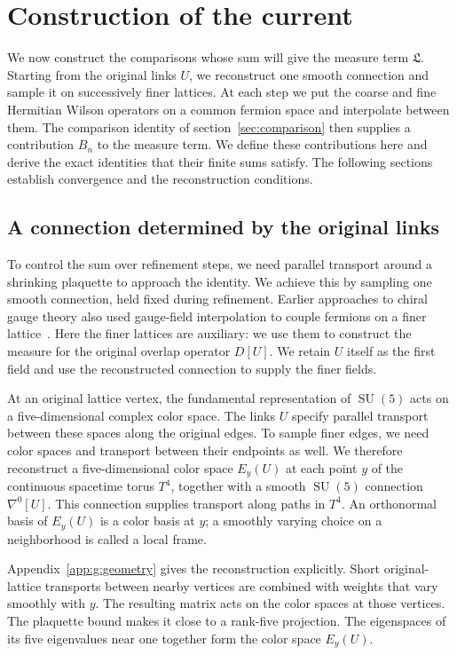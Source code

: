 \documentclass[11pt,a4paper]{article}
\theoremstyle{remark}
\DeclareMathOperator{\SU}{SU}
\begin{document}
\section{Construction of the current}
\label{sec:construction}

We now construct the comparisons whose sum will give the measure term
$\mathfrak L$. Starting from the original links $U$, we reconstruct one
smooth connection and sample it on successively finer lattices. At each
step we put the coarse and fine Hermitian Wilson operators on a common
fermion space and interpolate between them. The comparison identity of
section~\ref{sec:comparison} then supplies a contribution $B_n$ to the
measure term. We define these contributions here and derive the exact
identities that their finite sums satisfy. The following sections establish
convergence and the reconstruction conditions.

\subsection{A connection determined by the original links}

To control the sum over refinement steps, we need parallel transport
around a shrinking plaquette to approach the identity.
We achieve this by sampling one smooth connection, held fixed during
refinement. Earlier approaches to chiral gauge theory also used gauge-field
interpolation to couple fermions on a finer lattice~\cite{HernandezSundrumChiral,HernandezSundrumInterpolation}.
Here the finer lattices are auxiliary: we use them to construct the measure
for the original overlap operator $D[U]$. We retain $U$ itself as the
first field and use the reconstructed connection to supply the finer fields.

At an original lattice vertex, the fundamental representation of $\SU(5)$
acts on a five-dimensional complex color space. The links $U$ specify
parallel transport between these spaces along the original edges. To sample
finer edges, we need color spaces and transport between their endpoints as
well. We therefore reconstruct a five-dimensional color space $E_y(U)$ at
each point $y$ of the continuous spacetime torus $T^4$, together with a
smooth $\SU(5)$ connection $\nabla^0[U]$. This connection supplies transport
along paths in $T^4$. An orthonormal basis of $E_y(U)$ is a color basis at
$y$; a smoothly varying choice on a neighborhood is called a local frame.

Appendix~\ref{app:g:geometry} gives the reconstruction explicitly. Short
original-lattice transports between nearby vertices are combined with
weights that vary smoothly with $y$. The resulting matrix acts on the
color spaces at those vertices. The plaquette bound makes it close to a
rank-five projection. The eigenspaces of its five eigenvalues near one
together form the color space $E_y(U)$.
\end{document}
